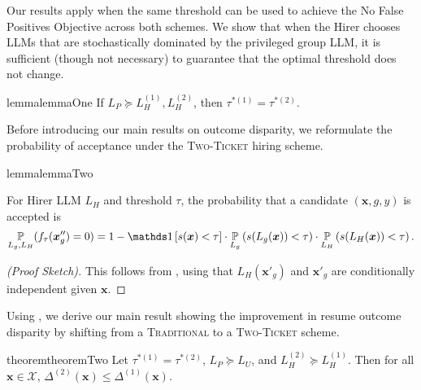         Our results apply when the same threshold can be used to achieve the No False Positives Objective across both schemes. We show that when the Hirer chooses LLMs that are stochastically dominated by the privileged group LLM, it is sufficient (though not necessary) to guarantee that the optimal threshold does not change.
        
        
        \begin{restatable}{lemma}{lemmaOne}
            \label{lem: when threshold stays the same}
            If \(L_P \succeq L_H^{(1)}, L_H^{(2)}\), then \(\tau^{*(1)} = \tau^{*(2)}\).
        \end{restatable}
        
        Before introducing our main results on outcome disparity, we reformulate the probability of acceptance under the \textsc{Two-Ticket} hiring scheme. 
        \begin{restatable}{lemma}{lemmaTwo}
            \label{lem: expression for two-ticket acceptance probability}
            
            For Hirer LLM \(L_H\) and threshold \(\tau\), the probability that a  candidate \((\bm{x}, g, y)\) is accepted is
            \begin{gather*}
                \P_{L_g, L_H}(f_\tau(\bm{x}''_g) = 0) =
                1 - 
                \one[s(\bm{x}) < \tau]\cdot
                \P_{L_g}\paren{
                    s(L_g(\bm{x})) < \tau
                }\cdot
                \P_{L_H}\paren{
                    s(L_H(\bm{x})) < \tau
                }
                .
            \end{gather*}
        \end{restatable}
        \begin{proof}[(\textit{Proof Sketch})]
            This follows from , using that \(L_H(\bm{x}'_g)\) and \(\bm{x}'_g\) are conditionally independent given \(\bm{x}\).
        \end{proof}

       Using , we derive our main result showing the improvement in resume outcome disparity by shifting from a \textsc{Traditional} to a \textsc{Two-Ticket} scheme.
        \begin{restatable}{theorem}{theoremTwo}
            \label{thm: two-ticket improves outcome disparity}
            Let \(\tau^{*(1)} = \tau^{*(2)}\), \(L_P \succeq L_U\), and \(L_H^{(2)} \succeq L_H^{(1)}\). Then for all \(\bm{x} \in \mathcal{X}\), \(\Delta^{(2)}(\bm{x}) \leq \Delta^{(1)}(\bm{x})\).
        \end{restatable}

